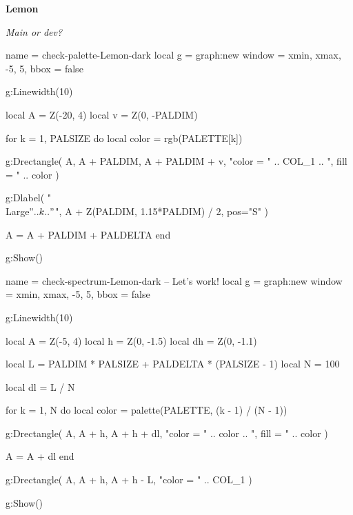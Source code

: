 \documentclass[theme = dark]{tutodoc}
\newcommand{\PALETTE}{Lemon}
\newcommand{\SRC}{Main or dev?}
\begin{document}
\pagestyle{empty}
\centering








{\Huge\bfseries\PALETTE\vphantom{g}}

\medskip

{\Huge\itshape \SRC}



\bigskip
\bigskip

\begin{luadraw}{name = check-palette-\PALETTE-dark}
local g = graph:new{
  window = {xmin, xmax, -5, 5},
  bbox   = false
}

g:Linewidth(10)

local A = Z(-20, 4)
local v = Z(0, -PALDIM)

for k = 1, PALSIZE do
  local color = rgb(PALETTE[k])

  g:Drectangle(
    A, A + PALDIM, A + PALDIM + v,
    "color = " .. COL_1 .. ", fill = " .. color
  )

  g:Dlabel(
    "\\Large$" .. k .. "$",
    A + Z(PALDIM, 1.15*PALDIM) / 2,
    {pos="S"}
  )

  A = A + PALDIM + PALDELTA
end

g:Show()
\end{luadraw}



\bigskip
\bigskip

\begin{luadraw}{name = check-spectrum-\PALETTE-dark}
-- Let's work!
local g = graph:new{
  window = {xmin, xmax, -5, 5},
  bbox   = false
}

g:Linewidth(10)

local A  = Z(-5, 4)
local h  = Z(0, -1.5)
local dh = Z(0, -1.1)

local L = PALDIM * PALSIZE + PALDELTA * (PALSIZE - 1)
local N = 100

local dl = L / N

for k = 1, N do
  local color = palette(PALETTE, (k - 1) / (N - 1))

  g:Drectangle(
    A, A + h, A + h + dl,
    "color = " .. color .. ", fill = " .. color
  )

  A = A + dl
end

g:Drectangle(
  A, A + h, A + h - L,
  "color = " .. COL_1
)

g:Show()
\end{luadraw}
\end{document}
